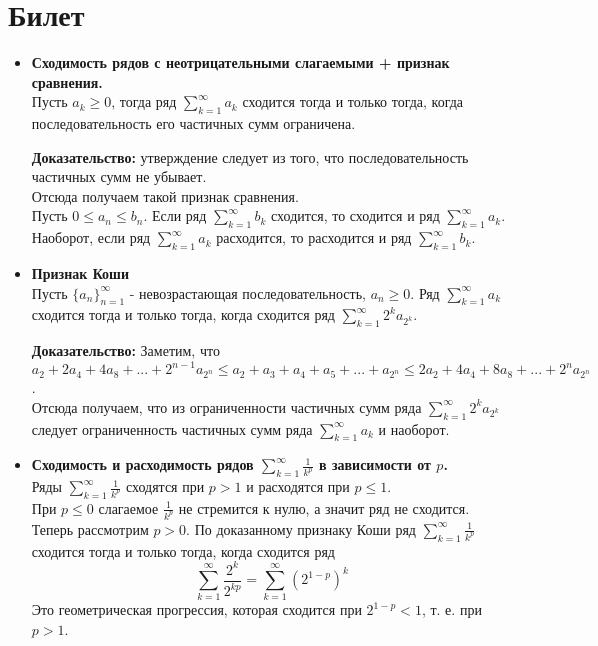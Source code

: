 \documentclass[12pt,a4paper]{article}
\begin{document}
\section{Билет}
\begin{itemize}
  \item \textbf{Сходимость рядов с неотрицательными слагаемыми + признак сравнения.}\\ 
  Пусть $a_k \geq 0$, тогда ряд $\sum_{k = 1}^{\infty} a_k$ сходится тогда и только тогда, когда последовательность его частичных сумм ограничена.
  
  \textbf{Доказательство:} утверждение следует из того, что последовательность частичных сумм не убывает. \\
  Отсюда получаем такой признак сравнения.\\
  Пусть $0 \leq a_n \leq b_n$. Если ряд $\sum_{k = 1}^{\infty} b_k$ сходится, то сходится и ряд $\sum_{k = 1}^{\infty} a_k$.\\
  Наоборот, если ряд $\sum_{k = 1}^{\infty} a_k$ расходится, то расходится и ряд $\sum_{k = 1}^{\infty} b_k$.\\
  \item \textbf{Признак Коши}\\
  Пусть $\{a_n\}_{n = 1}^{\infty}$ - невозрастающая последовательность, $a_n \geq 0$. Ряд $\sum_{k = 1}^{\infty} a_k$ сходится тогда и только тогда, когда сходится ряд $\sum_{k = 1}^{\infty} 2^k a_{2^k}$.
  
  \textbf{Доказательство:} Заметим, что $a_2 + 2a_4 + 4a_8 + ... + 2^{n - 1} a_{2^n} \leq a_2 + a_3 + a_4 + a_5 + ... + a_{2^n} \leq 2a_2 + 4a_4 + 8a_8 + ... + 2^n a_{2^n}$. \\
Отсюда получаем, что из ограниченности частичных сумм ряда $\sum_{k = 1}^{\infty} 2^k a_{2^k}$ следует ограниченность частичных сумм ряда $\sum_{k = 1}^{\infty} a_k$ и наоборот.
\\
\item \textbf{Сходимость и расходимость рядов $\sum_{k = 1}^{\infty} \frac{1}{k^p}$ в зависимости от $p$.}\\
Ряды $\sum_{k = 1}^{\infty} \frac{1}{k^p}$ сходятся при $p > 1$ и расходятся при $p \leq 1$.\\
При $p \leq 0$ слагаемое $\frac{1}{k^p}$ не стремится к нулю, а значит ряд не сходится.\\
Теперь рассмотрим $p > 0$. По доказанному признаку Коши ряд $\sum_{k = 1}^{\infty} \frac{1}{k^p}$ сходится тогда и только тогда, когда сходится ряд 
\[\sum_{k = 1}^{\infty} \frac{2^k}{2^{kp}} = \sum_{k = 1}^{\infty} (2^{1 - p})^k\]
Это геометрическая прогрессия, которая сходится при $2^{1 - p} < 1$, т. е. при $p > 1$.
\end{itemize}
\end{document}
